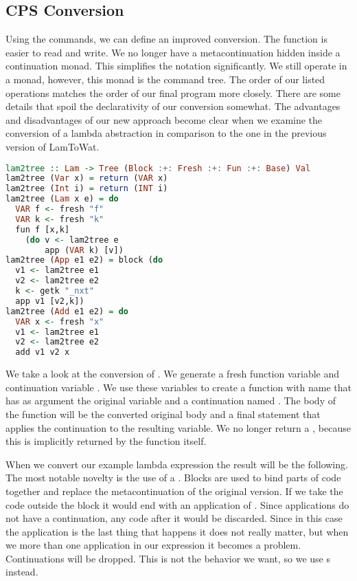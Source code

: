 \subsection{\label{subsection:cpsconvert2}CPS Conversion}
Using the  commands, we can define an improved  conversion. The function is easier to read and write. We no longer have a metacontinuation hidden inside a continuation monad. This simplifies the notation significantly. We still operate in a monad, however, this monad is the command tree. The order of our listed operations matches the order of our final program more closely. There are some details that spoil the declarativity of our conversion somewhat. The advantages and disadvantages of our new approach become clear when we examine the conversion of a lambda abstraction in comparison to the one in the previous version of LamToWat.

\begin{lstlisting}[language=Haskell]
lam2tree :: Lam -> Tree (Block :+: Fresh :+: Fun :+: Base) Val
lam2tree (Var x) = return (VAR x)
lam2tree (Int i) = return (INT i)
lam2tree (Lam x e) = do
  VAR f <- fresh "f"
  VAR k <- fresh "k"
  fun f [x,k]
    (do v <- lam2tree e
        app (VAR k) [v])
lam2tree (App e1 e2) = block (do
  v1 <- lam2tree e1
  v2 <- lam2tree e2
  k <- getk "_nxt"
  app v1 [v2,k])
lam2tree (Add e1 e2) = do
  VAR x <- fresh "x"
  v1 <- lam2tree e1
  v2 <- lam2tree e2
  add v1 v2 x
\end{lstlisting}

We take a look at the conversion of . We generate a fresh function variable  and continuation variable . We use these variables to create a function with name  that has as argument the original variable and a continuation named . The body of the function will be the converted original body and a final statement that applies the continuation to the resulting variable. We no longer return a , because this is implicitly returned by the function itself.

When we convert our example lambda expression  the result will be the following. The most notable novelty is the use of a . Blocks are used to bind parts of code together and replace the metacontinuation of the original version. If we take the code outside the block it would end with an application of . Since applications do not have a continuation, any code after it would be discarded. Since in this case the application is the last thing that happens it does not really matter, but when we more than one application in our expression it becomes a problem. Continuations will be dropped. This is not the behavior we want, so we use s instead.

